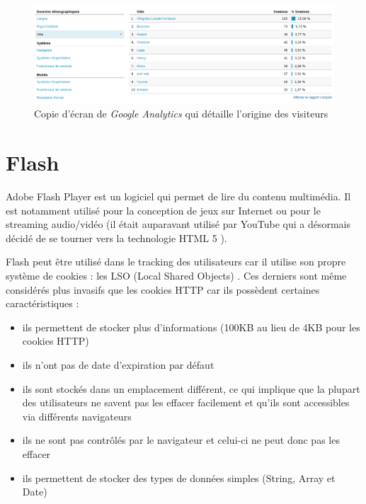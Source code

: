 \begin{figure}[h]
	\centering
	\includegraphics[scale=0.4]{examples/Google_Analytics_2.png}
	\caption{\label{Google_Analytics_2}Copie d'écran de \textit{Google Analytics} qui détaille l'origine des visiteurs}
\end{figure}

\section{Flash}
\label{flash}
Adobe Flash Player \cite{flash_website} est un logiciel qui permet de lire du contenu multimédia. Il est notamment utilisé pour la conception de jeux sur Internet ou pour le streaming audio/vidéo (il était auparavant utilisé par YouTube qui a désormais décidé de se tourner vers la technologie HTML 5 \cite{youtube_html5}).
\newline

Flash peut être utilisé dans le tracking des utilisateurs car il utilise son propre système de cookies : les LSO (Local Shared Objects) \cite{conf/aaaiss/SoltaniCMTH10}. Ces derniers sont même considérés plus invasifs que les cookies HTTP car ils possèdent certaines caractéristiques \cite{flash_lso} :
\begin{itemize}
  \item ils permettent de stocker plus d'informations (100KB au lieu de 4KB pour les cookies HTTP)
  \item ils n'ont pas de date d'expiration par défaut
  \item ils sont stockés dans un emplacement différent, ce qui implique que la plupart des utilisateurs ne savent pas les effacer facilement et qu'ils sont accessibles via différents navigateurs
  \item ils ne sont pas contrôlés par le navigateur et celui-ci ne peut donc pas les effacer
  \item ils permettent de stocker des types de données simples (String, Array et Date)
  \newline
\end{itemize}

